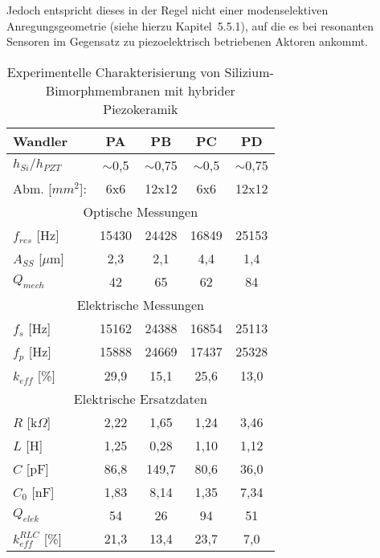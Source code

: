 Jedoch entspricht dieses in der Regel nicht einer modenselektiven
Anregungsgeometrie (siehe hierzu Kapitel~5.5.1), auf die es bei resonanten
Sensoren im Gegensatz zu piezoelektrisch betriebenen Aktoren ankommt.\\
\begin{table}[htb]
\caption{\label{tabpiezomess}
 Experimentelle Charakterisierung von Silizium-Bimorphmembranen
 mit hybrider Piezokeramik}
\begin{center}
\begin{tabular} {|l||c|c|c|c|}
\hline
 Wandler & PA & PB & PC & PD \\
\hline \hline
 $h_{Si}/h_{PZT}$  & $\sim$0,5 & $\sim$0,75 & $\sim$0,5 & $\sim$0,75 \\
 Abm. [$mm^{2}$]:  & 6x6  & 12x12 & 6x6  &  12x12 \\
\hline
 \multicolumn{5}{|c|}{Optische Messungen} \\
\hline
 $f_{res}$ [Hz]     & 15430 & 24428 & 16849 & 25153 \\
 $A_{SS}$ [$\mu$m]  &  2,3  &  2,1  &  4,4  &  1,4  \\
 $Q_{mech}$         &  42   &  65   &  62   &  84   \\
\hline
 \multicolumn{5}{|c|}{Elektrische Messungen} \\
\hline
 $f_{s}$ [Hz]   & 15162 & 24388 & 16854 & 25113 \\
 $f_{p}$ [Hz]   & 15888 & 24669 & 17437 & 25328 \\
\hline
 $k_{eff}$ [\%] & 29,9  & 15,1 & 25,6 & 13,0 \\
\hline
 \multicolumn{5}{|c|}{Elektrische Ersatzdaten } \\
\hline
 $R$ [k$\Omega$] & 2,22 & 1,65  & 1,24 & 3,46  \\
 $L$ [H]         & 1,25 & 0,28  & 1,10 & 1,12  \\
 $C$ [pF]        & 86,8 & 149,7 & 80,6 & 36,0  \\
 $C_{0}$ [nF]    & 1,83 & 8,14  & 1,35 & 7,34  \\
\hline
 $Q_{elek}$      & 54   & 26    & 94    & 51 \\
 $k_{eff}^{RLC}$ [\%] & 21,3 & 13,4 & 23,7 & 7,0 \\
\hline
\end{tabular}\\
\end{center}
\end{table}
